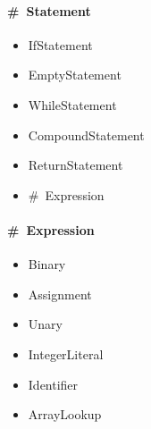 \documentclass[a4paper,11pt]{article}
\begin{document}
\begin{multicols}{2}
\paragraph{\#~Statement} 
\begin{itemize}
	\item IfStatement 
	\item EmptyStatement 
	\item WhileStatement 
	\item CompoundStatement 
	\item ReturnStatement 
	\item \#~Expression 
\end{itemize}


\paragraph{\#~Expression} 
\begin{itemize}
	\item Binary 
	\item Assignment 
	\item Unary 
	\item IntegerLiteral 
	\item Identifier 
	\item ArrayLookup
\end{itemize}
\end{multicols}
	
\end{document}
